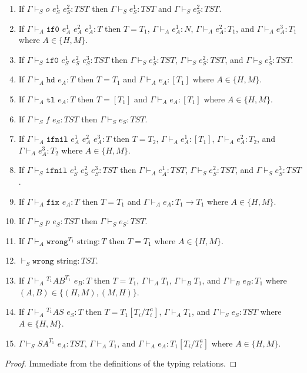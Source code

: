 \begin{lemma}
\begin{enumerate}
\item If $\Gamma\vdash_{S}o$ $e_{S}^{1}$ $e_{S}^{2}:TST$ then $\Gamma\vdash_{S}e_{S}^{1}:TST$ and $\Gamma\vdash_{S}e_{S}^{2}:TST$.
\item If $\Gamma\vdash_{A}\mathtt{if0}$ $e_{A}^{1}$ $e_{A}^{2}$ $e_{A}^{3}:T$ then $T=T_{1}$, $\Gamma\vdash_{A}e_{A}^{1}:N$, $\Gamma\vdash_{A}e_{A}^{2}:T_{1}$, and $\Gamma\vdash_{A}e_{A}^{3}:T_{1}$ where $A\in\lbrace H,M\rbrace$.
\item If $\Gamma\vdash_{S}\mathtt{if0}$ $e_{S}^{1}$ $e_{S}^{2}$ $e_{S}^{3}:TST$ then $\Gamma\vdash_{S}e_{S}^{1}:TST$, $\Gamma\vdash_{S}e_{S}^{2}:TST$, and $\Gamma\vdash_{S}e_{S}^{3}:TST$.
\item If $\Gamma\vdash_{A}\mathtt{hd}$ $e_{A}:T$ then $T=T_{1}$ and $\Gamma\vdash_{A}e_{A}:[T_{1}]$ where $A\in\lbrace H,M\rbrace$.
\item If $\Gamma\vdash_{A}\mathtt{tl}$ $e_{A}:T$ then $T=[T_{1}]$ and $\Gamma\vdash_{A}e_{A}:[T_{1}]$ where $A\in\lbrace H,M\rbrace$.
\item If $\Gamma\vdash_{S}f$ $e_{S}:TST$ then $\Gamma\vdash_{S}e_{S}:TST$.
\item If $\Gamma\vdash_{A}\mathtt{ifnil}$ $e_{A}^{1}$ $e_{A}^{2}$ $e_{A}^{3}:T$ then $T=T_{2}$, $\Gamma\vdash_{A}e_{A}^{1}:[T_{1}]$, $\Gamma\vdash_{A}e_{A}^{2}:T_{2}$, and $\Gamma\vdash_{A}e_{A}^{3}:T_{2}$ where $A\in\lbrace H,M\rbrace$.
\item If $\Gamma\vdash_{S}\mathtt{ifnil}$ $e_{S}^{1}$ $e_{S}^{2}$ $e_{S}^{3}:TST$ then $\Gamma\vdash_{A}e_{A}^{1}:TST$, $\Gamma\vdash_{S}e_{S}^{2}:TST$, and $\Gamma\vdash_{S}e_{S}^{3}:TST$.
\item If $\Gamma\vdash_{A}\mathtt{fix}$ $e_{A}:T$ then $T=T_{1}$ and $\Gamma\vdash_{A}e_{A}:T_{1}\rightarrow T_{1}$ where $A\in\lbrace H,M\rbrace$.
\item If $\Gamma\vdash_{S}p$ $e_{S}:TST$ then $\Gamma\vdash_{S}e_{S}:TST$.
\item If $\Gamma\vdash_{A}\mathtt{wrong}^{T_{1}}$ $\mathrm{string}:T$ then $T=T_{1}$ where $A\in\lbrace H,M\rbrace$.
\item $\vdash_{S}\mathtt{wrong}$ $\mathrm{string}:TST$.
\item If $\Gamma\vdash_{A}{^{T_{1}}A}B^{T_{1}}$ $e_{B}:T$ then $T=T_{1}$, $\Gamma\vdash_{A}T_{1}$, $\Gamma\vdash_{B}T_{1}$, and $\Gamma\vdash_{B}e_{B}:T_{1}$ where $(A,B)\in\lbrace(H,M),(M,H)\rbrace$.
\item If $\Gamma\vdash_{A}{^{T_{1}}A}S$ $e_{S}:T$ then $T=T_{1}[T_{i}/T_{i}^{a}]$, $\Gamma\vdash_{A}T_{1}$, and $\Gamma\vdash_{S}e_{S}:TST$ where $A\in\lbrace H,M\rbrace$.
\item $\Gamma\vdash_{S}SA^{T_{1}}$ $e_{A}:TST$, $\Gamma\vdash_{A}T_{1}$, and $\Gamma\vdash_{A}e_{A}:T_{1}[T_{i}/T_{i}^{a}]$ where $A\in\lbrace H,M\rbrace$.
\end{enumerate}
\begin{proof}
Immediate from the definitions of the typing relations.
\end{proof}
\end{lemma}